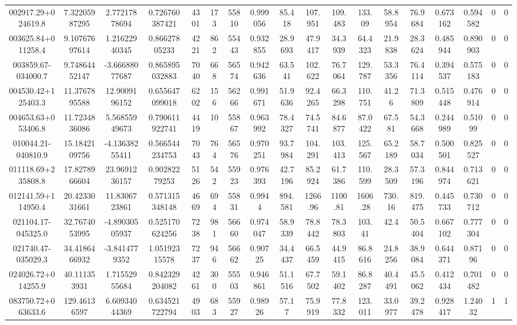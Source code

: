 \begin{table}
\begin{tabular}{cccccccccccccccccc}
002917.29+024619.8 & 7.32205987295 & 2.77217878694 & 0.726760387421 & 4301 & 173 & 55810 & 0.999056 & 85.418 & 107.951 & 109.483 & 133.09 & 58.8954 & 76.9684 & 0.673162 & 0.594582 & 0 & 0 \\
003625.84+011258.4 & 9.10767697614 & 1.21622940345 & 0.86627805233 & 4221 & 862 & 55443 & 0.932855 & 28.9693 & 47.9417 & 34.3939 & 64.4323 & 21.9838 & 28.3624 & 0.485944 & 0.890903 & 0 & 0 \\
003859.67-034000.7 & 9.74864452147 & -3.66688077687 & 0.865895032883 & 7040 & 668 & 56574 & 0.942636 & 63.541 & 102.622 & 76.7064 & 129.787 & 53.3356 & 76.4114 & 0.394537 & 0.575183 & 0 & 0 \\
004530.42+125403.3 & 11.3767895588 & 12.9009196152 & 0.655647099018 & 6202 & 156 & 56266 & 0.991671 & 51.9636 & 92.4265 & 66.3298 & 110.751 & 41.26 & 71.3809 & 0.515448 & 0.476914 & 0 & 0 \\
004653.63+053406.8 & 11.7234836086 & 5.56855949673 & 0.790611922741 & 4419 & 10 & 55867 & 0.963992 & 78.4327 & 74.5741 & 84.6877 & 87.0422 & 67.581 & 54.3668 & 0.244989 & 0.51099 & 0 & 0 \\
010044.21-040810.9 & 15.1842109756 & -4.13638255411 & 0.566544234753 & 7043 & 764 & 56576 & 0.970251 & 93.7984 & 104.291 & 103.413 & 125.567 & 65.2189 & 58.7034 & 0.500501 & 0.825527 & 0 & 0 \\
011118.69+235808.8 & 17.8278966604 & 23.9691236157 & 0.90282279253 & 5126 & 542 & 55923 & 0.976393 & 42.7196 & 85.2924 & 61.7386 & 110.599 & 28.3509 & 57.3196 & 0.844974 & 0.713621 & 0 & 0 \\
012141.59+114950.4 & 20.4233031661 & 11.8306723861 & 0.571315348148 & 4669 & 694 & 55831 & 0.9944 & 894.581 & 1266.96 & 1100.81 & 1606.28 & 730.16 & 819.475 & 0.445733 & 0.730712 & 0 & 0 \\
021104.17-045325.0 & 32.7674053995 & -4.89030505937 & 0.525170624256 & 7238 & 981 & 56660 & 0.974047 & 58.9339 & 78.8442 & 78.3803 & 103.41 & 42.4 & 50.5404 & 0.667102 & 0.777304 & 0 & 0 \\
021740.47-035029.3 & 34.4186466932 & -3.8414779352 & 1.05192315578 & 7237 & 946 & 56662 & 0.90725 & 34.4437 & 66.5459 & 44.9415 & 86.8616 & 24.8256 & 38.9084 & 0.644371 & 0.87196 & 0 & 0 \\
024026.72+014255.9 & 40.111353931 & 1.71552955684 & 0.842329204082 & 4261 & 300 & 55503 & 0.946861 & 51.1516 & 67.7502 & 59.1402 & 86.8287 & 40.4491 & 45.5062 & 0.412434 & 0.701482 & 0 & 0 \\
083750.72+063633.6 & 129.46136597 & 6.60934044369 & 0.634521722794 & 4903 & 683 & 55927 & 0.98926 & 57.17 & 75.9919 & 77.8332 & 123.011 & 33.0977 & 39.2478 & 0.928417 & 1.24032 & 1 & 1 \\

\end{tabular}
\end{table}
